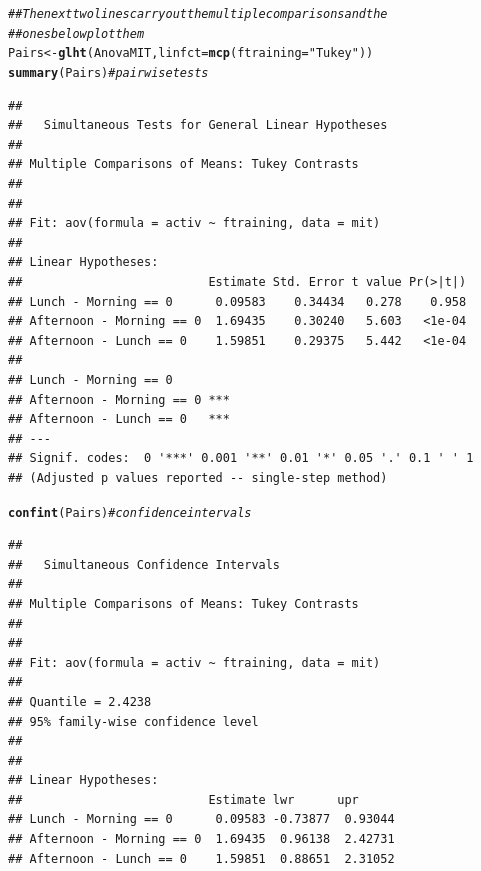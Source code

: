 \documentclass{config/apuntes}\usepackage[]{graphicx}\usepackage[]{xcolor}
\makeatletter
\newcommand{\hlsng}[1]{\textcolor[rgb]{0.192,0.494,0.8}{#1}}%
\newcommand{\hlcom}[1]{\textcolor[rgb]{0.678,0.584,0.686}{\textit{#1}}}%
\newcommand{\hldef}[1]{\textcolor[rgb]{0.345,0.345,0.345}{#1}}%
\newcommand{\hlkwb}[1]{\textcolor[rgb]{0.69,0.353,0.396}{#1}}%
\newcommand{\hlkwc}[1]{\textcolor[rgb]{0.333,0.667,0.333}{#1}}%
\newcommand{\hlkwd}[1]{\textcolor[rgb]{0.737,0.353,0.396}{\textbf{#1}}}%
\newenvironment{kframe}{%
 \def\at@end@of@kframe{}%
 \ifinner\ifhmode%
  \def\at@end@of@kframe{\end{minipage}}%
  \begin{minipage}{\columnwidth}%
 \fi\fi%
 \def\FrameCommand##1{\hskip\@totalleftmargin \hskip-\fboxsep
 \colorbox{shadecolor}{##1}\hskip-\fboxsep
     \hskip-\linewidth \hskip-\@totalleftmargin \hskip\columnwidth}%
 \MakeFramed {\advance\hsize-\width
   \@totalleftmargin\z@ \linewidth\hsize
   \@setminipage}}%
 {\par\unskip\endMakeFramed%
 \at@end@of@kframe}
\newenvironment{knitrout}{}{} %
\makeatother
\begin{document}
\begin{knitrout}
\begin{kframe}
{\ttfamily\noindent\itshape\color{messagecolor}{\#\# The following object is masked from 'package:MASS':\\\#\# \\\#\# \ \ \ \ geyser}}\begin{alltt}
\hlcom{## The next two lines carry out the multiple comparisons and the}
\hlcom{## ones below plot them}
\hldef{Pairs} \hlkwb{<-} \hlkwd{glht}\hldef{(AnovaMIT,} \hlkwc{linfct} \hldef{=} \hlkwd{mcp}\hldef{(}\hlkwc{ftraining} \hldef{=} \hlsng{"Tukey"}\hldef{))}
\hlkwd{summary}\hldef{(Pairs)} \hlcom{# pairwise tests}
\end{alltt}
\begin{verbatim}
## 
## 	 Simultaneous Tests for General Linear Hypotheses
## 
## Multiple Comparisons of Means: Tukey Contrasts
## 
## 
## Fit: aov(formula = activ ~ ftraining, data = mit)
## 
## Linear Hypotheses:
##                          Estimate Std. Error t value Pr(>|t|)
## Lunch - Morning == 0      0.09583    0.34434   0.278    0.958
## Afternoon - Morning == 0  1.69435    0.30240   5.603   <1e-04
## Afternoon - Lunch == 0    1.59851    0.29375   5.442   <1e-04
##                             
## Lunch - Morning == 0        
## Afternoon - Morning == 0 ***
## Afternoon - Lunch == 0   ***
## ---
## Signif. codes:  0 '***' 0.001 '**' 0.01 '*' 0.05 '.' 0.1 ' ' 1
## (Adjusted p values reported -- single-step method)
\end{verbatim}
\begin{alltt}
\hlkwd{confint}\hldef{(Pairs)} \hlcom{# confidence intervals}
\end{alltt}
\begin{verbatim}
## 
## 	 Simultaneous Confidence Intervals
## 
## Multiple Comparisons of Means: Tukey Contrasts
## 
## 
## Fit: aov(formula = activ ~ ftraining, data = mit)
## 
## Quantile = 2.4238
## 95% family-wise confidence level
##  
## 
## Linear Hypotheses:
##                          Estimate lwr      upr     
## Lunch - Morning == 0      0.09583 -0.73877  0.93044
## Afternoon - Morning == 0  1.69435  0.96138  2.42731
## Afternoon - Lunch == 0    1.59851  0.88651  2.31052
\end{verbatim}
\end{kframe}
\end{knitrout}
\end{document}
